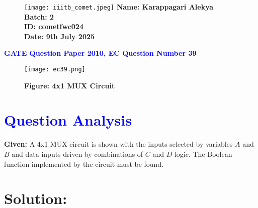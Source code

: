 \documentclass[twocolumn]{article}
\begin{document}
\begin{figure}[t]
        \texttt{[image: iiitb\_comet.jpeg]} %
        \textbf{Name: Karappagari Alekya} \\
        \textbf{Batch: 2} \\
        \textbf{ID: cometfwc024} \\
        \textbf{Date: 9th July 2025}
\end{figure}

\begin{center}
    {\LARGE \textbf{\textcolor{blue}{GATE Question Paper 2010, EC Question Number 39}}}
\end{center}

\vspace{1em}
\begin{figure}[h]
    \centering
    \texttt{[image: ec39.png]}
    \caption*{\textbf{Figure: 4x1 MUX Circuit}}
\end{figure}

\section*{\textcolor{blue}{Question Analysis}}
\textbf{Given:} A 4x1 MUX circuit is shown with the inputs selected by variables $A$ and $B$ and data inputs driven by combinations of $C$ and $D$ logic. The Boolean function implemented by the circuit must be found.

\section*{Solution:}
\end{document}
